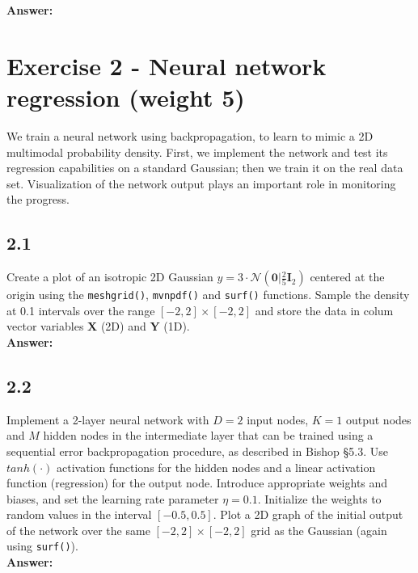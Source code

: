 \documentclass[a4paper]{article}
\begin{document}
\textbf{Answer:}\\


\section*{Exercise 2 - Neural network regression (weight 5)}

We train a neural network using backpropagation, to learn to mimic a 2D multimodal probability density. First, we implement the network and test its regression capabilities on a standard Gaussian; then we train it on the real data set. Visualization of the network output plays an important role in monitoring the progress.

\subsection*{2.1}

Create a plot of an isotropic 2D Gaussian $y = 3 \cdot \mathcal{N}(\textbf{0}|\frac{2}{5}\textbf{I}_2)$ centered at the origin using the \texttt{meshgrid()}, \texttt{mvnpdf()} and \texttt{surf()} functions. Sample the density at 0.1 intervals over the range $[-2,2] \times [-2,2]$ and store the data in colum vector variables $\textbf{X}$ (2D) and $\textbf{Y}$ (1D).\\

\textbf{Answer:}\\







\subsection*{2.2}

Implement a 2-layer neural network with $D = 2$ input nodes, $K = 1$ output nodes and $M$ hidden nodes in the intermediate layer that can be trained using a sequential error backpropagation procedure, as described in Bishop §5.3. Use $tanh(\cdot)$ activation functions for the hidden nodes and a linear activation function (regression) for the output node. Introduce appropriate weights and biases, and set the learning rate parameter $\eta = 0.1$. Initialize the weights to random values in the interval $[-0.5,0.5]$. Plot a 2D graph of the initial output of the network over the same $[-2,2] \times [-2,2]$ grid as the Gaussian (again using \texttt{surf()}).\\

\textbf{Answer:}\\
\end{document}
